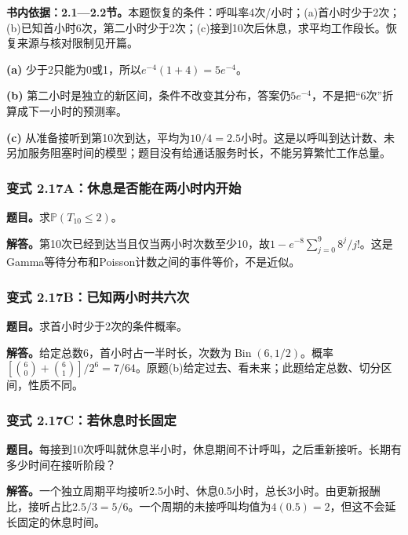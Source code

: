 \documentclass[12pt,a4paper,UTF8,fontset=fandol]{ctexart}
\begin{document}
\textbf{书内依据：2.1---2.2节。}本题恢复的条件：呼叫率4次/小时；(a)首小时少于2次；(b)已知首小时6次，第二小时少于2次；(c)接到10次后休息，求平均工作段长。恢复来源与核对限制见开篇。

\textbf{(a)} 少于2只能为0或1，所以\(\boxed{e^{-4}(1+4)=5e^{-4}}\)。

\textbf{(b)}
第二小时是独立的新区间，条件不改变其分布，答案仍\(\boxed{5e^{-4}}\)，不是把``6次''折算成下一小时的预测率。

\textbf{(c)}
从准备接听到第10次到达，平均为\(\boxed{10/4=2.5\text{小时}}\)。这是以呼叫到达计数、未另加服务阻塞时间的模型；题目没有给通话服务时长，不能另算繁忙工作总量。

\subsubsection{变式
2.17A：休息是否能在两小时内开始}\label{ux53d8ux5f0f-2.17aux4f11ux606fux662fux5426ux80fdux5728ux4e24ux5c0fux65f6ux5185ux5f00ux59cb}

\textbf{题目。}求\(\mathbb P(T_{10}\le2)\)。

\textbf{解答。}第10次已经到达当且仅当两小时次数至少10，故\(1-e^{-8}\sum_{j=0}^9 8^j/j!\)。这是Gamma等待分布和Poisson计数之间的事件等价，不是近似。

\subsubsection{变式
2.17B：已知两小时共六次}\label{ux53d8ux5f0f-2.17bux5df2ux77e5ux4e24ux5c0fux65f6ux5171ux516dux6b21}

\textbf{题目。}求首小时少于2次的条件概率。

\textbf{解答。}给定总数6，首小时占一半时长，次数为\(\operatorname{Bin}(6,1/2)\)。概率\([\binom60+\binom61]/2^6=7/64\)。原题(b)给定过去、看未来；此题给定总数、切分区间，性质不同。

\subsubsection{变式
2.17C：若休息时长固定}\label{ux53d8ux5f0f-2.17cux82e5ux4f11ux606fux65f6ux957fux56faux5b9a}

\textbf{题目。}每接到10次呼叫就休息半小时，休息期间不计呼叫，之后重新接听。长期有多少时间在接听阶段？

\textbf{解答。}一个独立周期平均接听2.5小时、休息0.5小时，总长3小时。由更新报酬比，接听占比\(2.5/3=5/6\)。一个周期的未接呼叫均值为\(4(0.5)=2\)，但这不会延长固定的休息时间。
\end{document}
